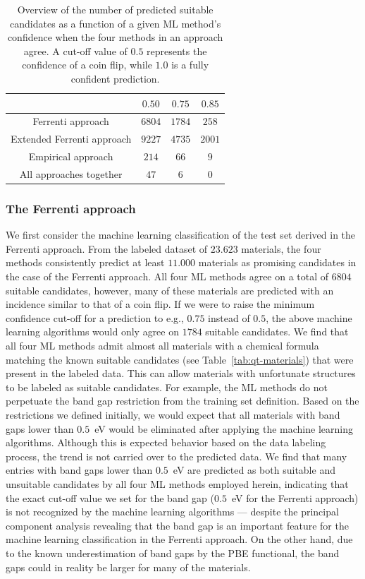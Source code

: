 \documentclass[superscriptaddress,unsortedaddress,
 amsmath,amssymb,
 aps,
]{revtex4-2}
\begin{document}
\begin{table}[t]
    \centering 
    \caption{Overview of the number of predicted suitable candidates as a function of a given ML method's confidence when the four methods in an approach agree. A cut-off value of $0.5$ represents the confidence of a coin flip, while $1.0$ is a fully confident prediction.}
    \begin{tabular}{c|c|c|c}
      & $0.50$ & $0.75$ & $0.85$ \\
     \hline
     Ferrenti approach &  $6804$ & $1784$ & $258$  \\
     Extended Ferrenti approach &  $9227$ & $4735$  & $2001$  \\ 
     Empirical approach & $214$ & $66$ & $9$ \\
     \hline
     All approaches together & $47$ & $6$ & 0 \\
    \end{tabular}
    \label{tab:probabilites}
\end{table} 

\subsubsection*{The Ferrenti approach}

We first consider the machine learning classification of the test set derived in the Ferrenti approach. 
From the labeled dataset of $23.623$ materials, the four methods consistently predict at least $11.000$ materials as promising candidates in the case of the Ferrenti approach. All four ML methods agree on a total of $6804$ suitable candidates, however, many of these materials are predicted with an incidence similar to that of a coin flip. If we were to raise the minimum confidence cut-off for a prediction to e.g., $0.75$ instead of $0.5$, the above machine learning algorithms would only agree on $1784$ suitable candidates. 
We find that all four ML methods admit almost all materials with a chemical formula matching the known suitable candidates (see Table~\ref{tab:qt-materials}) that were present in the labeled data. 
This can allow materials with unfortunate structures to be labeled as suitable candidates. %
For example, the ML methods do not perpetuate the band gap restriction from the training set definition. 
Based on the restrictions we defined initially, we would expect that all materials with band gaps lower than $0.5$~eV would be eliminated 
after applying the machine learning algorithms.  
Although this is expected behavior based on the data labeling process, the trend is not carried over to the predicted data. We find that many entries with band gaps lower than $0.5$~eV are predicted as both suitable and unsuitable candidates by all four ML methods employed herein, 
indicating that the exact cut-off value we set for the band gap ($0.5$~eV for the Ferrenti approach) is not recognized by the machine learning algorithms --- despite the principal component analysis revealing that the band gap is an important feature for the machine learning classification in the Ferrenti approach.  
On the other hand, due to the known underestimation of band gaps by the PBE functional, the band gaps could in reality be larger for many of the materials. 
\end{document}
